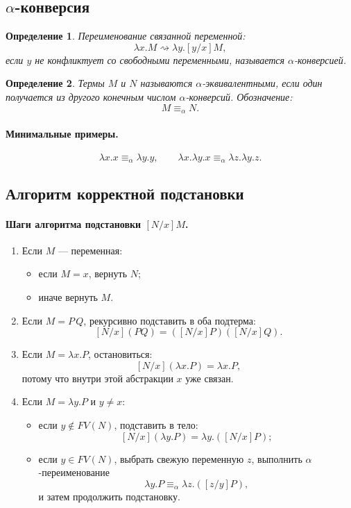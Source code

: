 \documentclass[12pt,a4paper]{article}
\newtheorem{definition}{Определение}
\theoremstyle{remark}
\begin{document}
\subsection{$\alpha$-конверсия}

\begin{definition}
Переименование связанной переменной:
\[
\lambda x.M \rightsquigarrow \lambda y.[y/x]M,
\]
если $y$ не конфликтует со свободными переменными, называется \emph{$\alpha$-конверсией}.
\end{definition}

\begin{definition}
Термы $M$ и $N$ называются \emph{$\alpha$-эквивалентными}, если один получается из другого конечным числом $\alpha$-конверсий. Обозначение:
\[
M\equiv_\alpha N.
\]
\end{definition}

\paragraph{Минимальные примеры.}
\[
\lambda x.x \equiv_\alpha \lambda y.y,
\qquad
\lambda x.\lambda y.x \equiv_\alpha \lambda z.\lambda y.z.
\]

\subsection{Алгоритм корректной подстановки}

\paragraph{Шаги алгоритма подстановки $[N/x]M$.}
\begin{enumerate}
    \item Если $M$ --- переменная:
    \begin{itemize}
        \item если $M=x$, вернуть $N$;
        \item иначе вернуть $M$.
    \end{itemize}
    \item Если $M=P\,Q$, рекурсивно подставить в оба подтерма:
    \[
    [N/x](PQ)=([N/x]P)([N/x]Q).
    \]
    \item Если $M=\lambda x.P$, остановиться:
    \[
    [N/x](\lambda x.P)=\lambda x.P,
    \]
    потому что внутри этой абстракции $x$ уже связан.
    \item Если $M=\lambda y.P$ и $y\neq x$:
    \begin{itemize}
        \item если $y\notin FV(N)$, подставить в тело:
        \[
        [N/x](\lambda y.P)=\lambda y.([N/x]P);
        \]
        \item если $y\in FV(N)$, выбрать свежую переменную $z$, выполнить $\alpha$-переименование
        \[
        \lambda y.P \equiv_\alpha \lambda z.([z/y]P),
        \]
        и затем продолжить подстановку.
    \end{itemize}
\end{enumerate}
\end{document}
